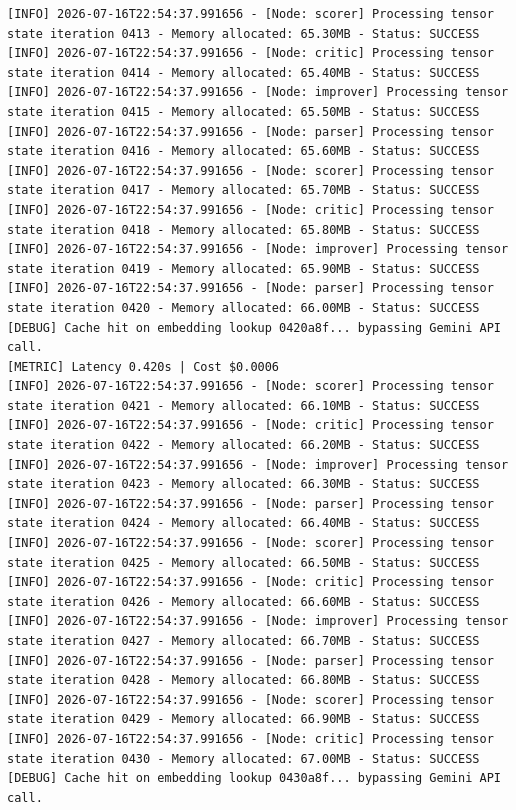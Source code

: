 \documentclass[10pt,journal,compsoc]{IEEEtran}
\begin{document}
\begin{verbatim}
[INFO] 2026-07-16T22:54:37.991656 - [Node: scorer] Processing tensor state iteration 0413 - Memory allocated: 65.30MB - Status: SUCCESS
[INFO] 2026-07-16T22:54:37.991656 - [Node: critic] Processing tensor state iteration 0414 - Memory allocated: 65.40MB - Status: SUCCESS
[INFO] 2026-07-16T22:54:37.991656 - [Node: improver] Processing tensor state iteration 0415 - Memory allocated: 65.50MB - Status: SUCCESS
[INFO] 2026-07-16T22:54:37.991656 - [Node: parser] Processing tensor state iteration 0416 - Memory allocated: 65.60MB - Status: SUCCESS
[INFO] 2026-07-16T22:54:37.991656 - [Node: scorer] Processing tensor state iteration 0417 - Memory allocated: 65.70MB - Status: SUCCESS
[INFO] 2026-07-16T22:54:37.991656 - [Node: critic] Processing tensor state iteration 0418 - Memory allocated: 65.80MB - Status: SUCCESS
[INFO] 2026-07-16T22:54:37.991656 - [Node: improver] Processing tensor state iteration 0419 - Memory allocated: 65.90MB - Status: SUCCESS
[INFO] 2026-07-16T22:54:37.991656 - [Node: parser] Processing tensor state iteration 0420 - Memory allocated: 66.00MB - Status: SUCCESS
[DEBUG] Cache hit on embedding lookup 0420a8f... bypassing Gemini API call.
[METRIC] Latency 0.420s | Cost $0.0006
[INFO] 2026-07-16T22:54:37.991656 - [Node: scorer] Processing tensor state iteration 0421 - Memory allocated: 66.10MB - Status: SUCCESS
[INFO] 2026-07-16T22:54:37.991656 - [Node: critic] Processing tensor state iteration 0422 - Memory allocated: 66.20MB - Status: SUCCESS
[INFO] 2026-07-16T22:54:37.991656 - [Node: improver] Processing tensor state iteration 0423 - Memory allocated: 66.30MB - Status: SUCCESS
[INFO] 2026-07-16T22:54:37.991656 - [Node: parser] Processing tensor state iteration 0424 - Memory allocated: 66.40MB - Status: SUCCESS
[INFO] 2026-07-16T22:54:37.991656 - [Node: scorer] Processing tensor state iteration 0425 - Memory allocated: 66.50MB - Status: SUCCESS
[INFO] 2026-07-16T22:54:37.991656 - [Node: critic] Processing tensor state iteration 0426 - Memory allocated: 66.60MB - Status: SUCCESS
[INFO] 2026-07-16T22:54:37.991656 - [Node: improver] Processing tensor state iteration 0427 - Memory allocated: 66.70MB - Status: SUCCESS
[INFO] 2026-07-16T22:54:37.991656 - [Node: parser] Processing tensor state iteration 0428 - Memory allocated: 66.80MB - Status: SUCCESS
[INFO] 2026-07-16T22:54:37.991656 - [Node: scorer] Processing tensor state iteration 0429 - Memory allocated: 66.90MB - Status: SUCCESS
[INFO] 2026-07-16T22:54:37.991656 - [Node: critic] Processing tensor state iteration 0430 - Memory allocated: 67.00MB - Status: SUCCESS
[DEBUG] Cache hit on embedding lookup 0430a8f... bypassing Gemini API call.

\end{verbatim}
\end{document}
